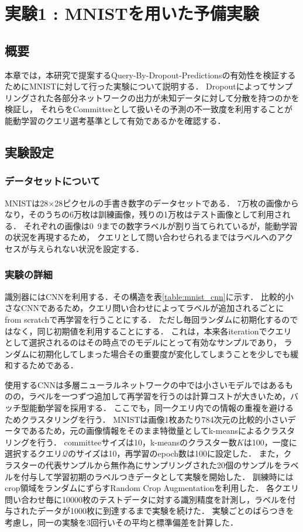 \chapter{実験1 : MNISTを用いた予備実験}

\section{概要}
本章では，本研究で提案するQuery-By-Dropout-Predictionsの有効性を検証するためにMNISTに対して行った実験について説明する．
Dropoutによってサンプリングされた各部分ネットワークの出力が未知データに対して分散を持つのかを検証し，
それらをCommitteeとして扱いその予測の不一致度を利用することが能動学習のクエリ選考基準として有効であるかを確認する．


\section{実験設定}

\subsection{データセットについて}
MNISTは28×28ピクセルの手書き数字のデータセットである．
7万枚の画像からなり，そのうちの6万枚は訓練画像，残りの1万枚はテスト画像として利用される．
それぞれの画像は0~9までの数字ラベルが割り当てられているが，能動学習の状況を再現するため，
クエリとして問い合わせられるまではラベルへのアクセスが与えられない状況を設定する．


\subsection{実験の詳細}


識別器にはCNNを利用する．その構造を表\ref{table:mnist_cnn}に示す．
比較的小さなCNNであるため，クエリ問い合わせによってラベルが追加されるごとにfrom scratchで再学習を行うことにする．
ただし毎回ランダムに初期化するのではなく，同じ初期値を利用することにする．
これは，本来各iterationでクエリとして選択されるのはその時点でのモデルにとって有効なサンプルであり，
ランダムに初期化してしまった場合その重要度が変化してしまうことを少しでも緩和するためである．

使用するCNNは多層ニューラルネットワークの中では小さいモデルではあるものの，ラベルを一つずつ追加して再学習を行うのは計算コストが大きいため，バッチ型能動学習を採用する．
ここでも，同一クエリ内での情報の重複を避けるためクラスタリングを行う．
MNISTは画像1枚あたり784次元の比較的小さいデータであるため，元の画像情報をそのまま特徴量としてk-meansによるクラスタリングを行う．
committeeサイズは10，k-meansのクラスター数$K$は100，一度に選択するクエリ$\mathcal{Q}$のサイズは10，再学習のepoch数は100に設定した．
また，クラスターの代表サンプルから無作為にサンプリングされた20個のサンプルをラベルを付与して学習初期のラベルつきデータとして実験を開始した．
訓練時にはcrop領域をランダムにずらすRandom Crop Augmentationを利用した．
各クエリ問い合わせ毎に10000枚のテストデータに対する識別精度を計測し，ラベルを付与されたデータが1000枚に到達するまで実験を続けた．
実験ごとのばらつきを考慮し，同一の実験を3回行いその平均と標準偏差を計算した．


